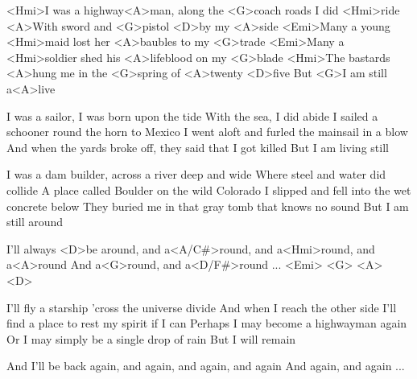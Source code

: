 
\zs
<Hmi>I was a highway<A>man, along the <G>coach roads I did <Hmi>ride
<A>With sword and <G>pistol <D>by my <A>side
<Emi>Many a young <Hmi>maid lost her <A>baubles to my <G>trade
<Emi>Many a <Hmi>soldier shed his <A>lifeblood on my <G>blade
<Hmi>The bastards <A>hung me in the <G>spring of <A>twenty <D>five
But <G>I am still a<A>live
\ks

\zs
I was a sailor, I was born upon the tide
With the sea, I did abide
I sailed a schooner round the horn to Mexico
I went aloft and furled the mainsail in a blow
And when the yards broke off, they said that I got killed
But I am living still
\ks

\zs
I was a dam builder, across a river deep and wide
Where steel and water did collide
A place called Boulder on the wild Colorado
I slipped and fell into the wet concrete below
They buried me in that gray tomb that knows no sound
But I am still around
\ks

\zs
I'll always <D>be around, and a<A/C#>round, and a<Hmi>round, and a<A>round
And a<G>round, and a<D/F#>round ... <Emi> <G> <A> <D>
\ks

\zs
I'll fly a starship 'cross the universe divide
And when I reach the other side
I'll find a place to rest my spirit if I can
Perhaps I may become a highwayman again
Or I may simply be a single drop of rain
But I will remain
\ks

\zs
And I'll be back again, and again, and again, and again
And again, and again ...
\ks

\kp
